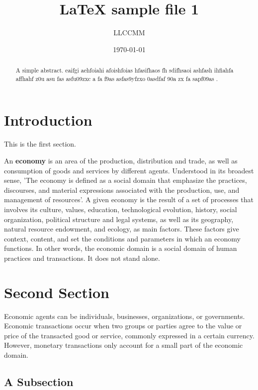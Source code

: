 \documentclass[12pt]{article}
\begin{document}
\title{LaTeX sample file 1}
\author{LLCCMM}
\date{\today}

\maketitle

\begin{abstract}
	A simple abstract. eaifgi aehfoiahi  afoishfoias hfasifhaos fh  sdifhsaoi ashfash  ihfiahfa  affhahf z0u asu fas asfu09zxc a fa f9as asfas9yfzxo 0asdfaf 90a zx fa sapf09as .
\end{abstract}

\section{Introduction}

This is the first section.

An \textbf{economy} is an area of the production, distribution and trade, as well as consumption of goods and services by different agents. Understood in its broadest sense, 'The economy is defined as a social domain that emphasize the practices, discourses, and material expressions associated with the production, use, and management of resources'. A given economy is the result of a set of processes that involves its culture, values, education, technological evolution, history, social organization, political structure and legal systems, as well as its geography, natural resource endowment, and ecology, as main factors. These factors give context, content, and set the conditions and parameters in which an economy functions. In other words, the economic domain is a social domain of human practices and transactions. It does not stand alone.

\section{Second Section}

{\Large Economic agents can be individuals, businesses, organizations, or governments. Economic transactions occur when two groups or parties agree to the value or price of the transacted good or service, commonly expressed in a certain currency. However, monetary transactions only account for a small part of the economic domain.}

\subsection{A Subsection}
\end{document}

